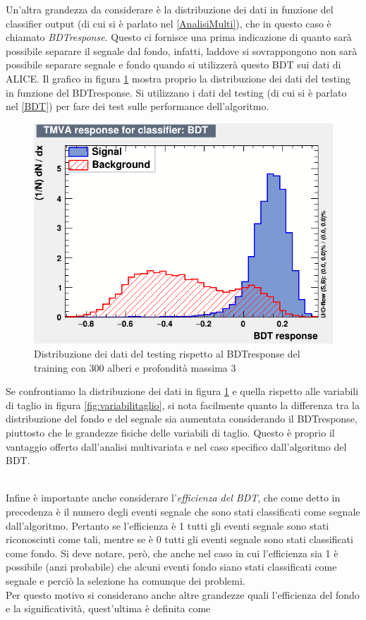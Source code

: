 Un'altra grandezza da considerare è la distribuzione dei dati in funzione del classifier output (di cui si è parlato nel \ref{AnalisiMulti}), che in questo caso è chiamato \textit{BDTresponse}. Questo ci fornisce una prima indicazione di quanto sarà possibile separare il segnale dal fondo, infatti, laddove si sovrappongono non sarà possibile separare segnale e fondo quando si utilizzerà questo BDT sui dati di ALICE. Il grafico in figura \ref{fig:BDTresponse} mostra proprio la distribuzione dei dati del testing in funzione del BDTresponse. Si utilizzano i dati del testing (di cui si è parlato nel \ref{BDT}) per fare dei test sulle performance dell'algoritmo. 

    \begin{figure}[htbp] 
        \centering
        \includegraphics[width=0.7\linewidth]{training&testing/BDTresponsetest.png}
        \caption{Distribuzione dei dati del testing rispetto al BDTresponse del training con 300 alberi e profondità massima 3}
        \label{fig:BDTresponse}
    \end{figure}
    
Se confrontiamo la distribuzione dei dati in figura \ref{fig:BDTresponse} e quella rispetto alle variabili di taglio in figura \ref{fig:variabilitaglio}, si nota facilmente quanto la differenza tra la distribuzione del fondo e del segnale sia aumentata considerando il BDTresponse, piuttosto che le grandezze fisiche delle variabili di taglio. Questo è proprio il vantaggio offerto dall'analisi multivariata e nel caso specifico dall'algoritmo del BDT.
    
\\Infine è importante anche considerare l'\textit{efficienza del BDT}, che come detto in precedenza è il numero degli eventi segnale che sono stati classificati come segnale dall'algoritmo. Pertanto se l'efficienza è 1 tutti gli eventi segnale sono stati riconosciuti come tali, mentre se è 0 tutti gli eventi segnale sono stati classificati come fondo. Si deve notare, però, che anche nel caso in cui  l'efficienza sia 1 è possibile (anzi probabile) che alcuni eventi fondo siano stati classificati come segnale e perciò la selezione ha comunque dei problemi.
\\Per questo motivo si considerano anche altre grandezze quali l'efficienza del fondo e la significatività, quest'ultima è definita come 

